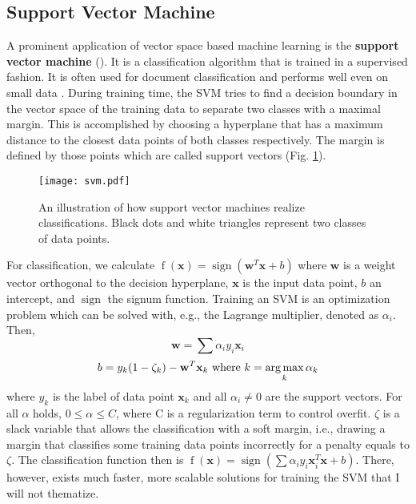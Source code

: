 \subsection{Support Vector Machine}
  A prominent application of vector space based machine learning is the \textbf{support vector machine} ().
  It is a classification algorithm that is trained in a supervised fashion. It is often used for document classification and performs well even on small data \citep{Manning2008}.
  During training time, the SVM tries to find a decision boundary in the vector space of the training data to separate two classes with a maximal margin.
  This is accomplished by choosing a hyperplane that has a maximum distance to the closest data points of both classes respectively. The margin is defined by those points which are called support vectors (Fig. \ref{fig:svm}).
  \begin{figure}[h!]
      \centering
      \texttt{[image: svm.pdf]}
      \caption{An illustration of how support vector machines realize classifications. Black dots and white triangles represent two classes of data points.}
      \label{fig:svm}
  \end{figure}
  For classification, we calculate $\operatorname{f}(\mathbf{x}) = \operatorname{sign}(\mathbf{w}^{T}\mathbf{x} + b)$ where $\mathbf{w}$ is a weight vector orthogonal to the decision hyperplane, $\mathbf{x}$ is the input data point, $b$ an intercept, and $\operatorname{sign}$ the signum function.
  Training an SVM is an optimization problem which can be solved with, e.g., the Lagrange multiplier, denoted as $\alpha_i$.
  Then,
    \[\mathbf{w} = \sum \alpha_i y_i \mathbf{x}_i \]
    \[b = y_k (1-\zeta_k) - \mathbf{w}^T \mathbf{x}_k \text{ where }k = \operatorname*{arg\,max}_k \alpha_k \]
  where $y_k$ is the label of data point $\mathbf{x}_k$ and all $\alpha_i \neq 0$ are the support vectors. For all $\alpha$ holds, $0 \leq \alpha \leq C$, where C is a regularization term to control overfit. $\zeta$ is a slack variable that allows the classification with a soft margin, i.e., drawing a margin that classifies some training data points incorrectly for a penalty equals to $\zeta$.
  The classification function then is $\operatorname{f}(\mathbf{x}) = \operatorname{sign}(\sum \alpha_i y_i \mathbf{x}^{T}_i\mathbf{x} + b)$.
  There, however, exists much faster, more scalable solutions for training the SVM that I will not thematize.


